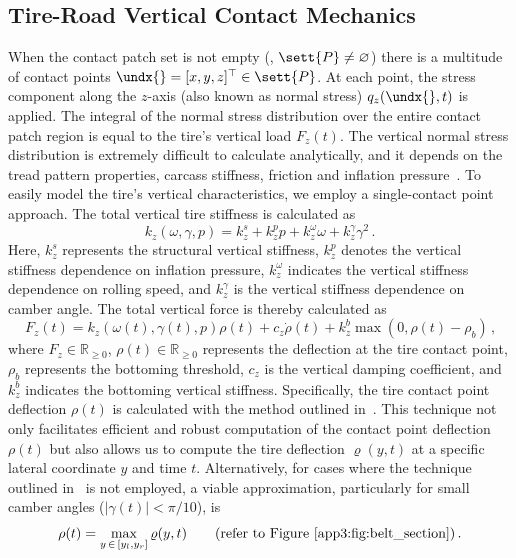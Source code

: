 
\subsection{Tire-Road Vertical Contact Mechanics}
\label{app3:sec:vertical_contact}

When the contact patch set is not empty (\ie{}, $\sett{P} \neq \varnothing$) there is a multitude of contact points $\undx{} = [x,y,z]^\top \in \sett{P}$. At each point, the stress component along the $z$-axis (also known as normal stress) $q_z(\undx{},t)$ is applied. The integral of the normal stress distribution over the entire contact patch region is equal to the tire's vertical load $F_z(t)$. The vertical normal stress distribution is extremely difficult to calculate analytically, and it depends on the tread pattern properties, carcass stiffness, friction and inflation pressure~\cite{nakajima2019advanced}. To easily model the tire's vertical characteristics, we employ a single-contact point approach. The total vertical tire stiffness is calculated as
%
\begin{equation}
  k_z(\omega, \gamma, p) = k_z^s + k_z^p p + k_z^\omega \omega + k_z^\gamma \gamma^2 \, \text{.}
\end{equation}
%
Here, $k_z^s$ represents the structural vertical stiffness, $k_z^p$ denotes the vertical stiffness dependence on inflation pressure, $k_z^\omega$ indicates the vertical stiffness dependence on rolling speed, and $k_z^\gamma$ is the vertical stiffness dependence on camber angle. The total vertical force is thereby calculated as
%
\begin{equation}
  F_z(t) = k_z(\omega(t), \gamma(t), p) \rho(t) + c_z \dot{\rho}(t) + k_z^b \max(0, \rho(t)-\rho_b) \, \text{,}
  \label{app3:eq:vertical_force}
\end{equation}
%
where $F_z \in \mathbb{R}_{\geq 0}$, $\rho(t) \in \mathbb{R}_{\geq 0}$ represents the deflection at the tire contact point, $\rho_b$ represents the bottoming threshold, $c_z$ is the vertical damping coefficient, and $k_z^b$ indicates the bottoming vertical stiffness. Specifically, the tire contact point deflection $\rho(t)$ is calculated with the method outlined in~\cite{stocco2024novel, stocco2021acme}. This technique not only facilitates efficient and robust computation of the contact point deflection $\rho(t)$ but also allows us to compute the tire deflection $\varrho(y,t)$ at a specific lateral coordinate $y$ and time $t$. Alternatively, for cases where the technique outlined in~\cite{stocco2024novel} is not employed, a viable approximation, particularly for small camber angles ($|\gamma(t)| < \pi/10$), is
%
\begin{equation}
  \rho(t) = \max_{y \, \in \, [y_l, y_r]} \varrho(y,t) \qquad \text{(refer to \figurename~\ref{app3:fig:belt_section})} \, \text{.}
\end{equation}

